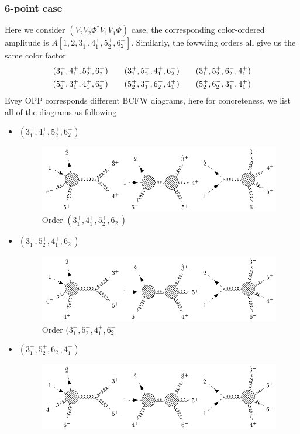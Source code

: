 \documentclass[12pt]{article}
\numberwithin{equation}{section}
\begin{document}
\subsubsection{6-point case}
Here we consider $(V_2V_2\Phi^\dagger V_1V_1 \Phi)$ case, the corresponding color-ordered amplitude is $A[1,2,3_1^+,4_1^+,5_2^+,6_2^-]$.
Similarly, the fowwling orders all give us the same color factor
\begin{gather}
    (3_1^+,4_1^+,5_2^+,6_2^-)\qquad(3_1^+,5_2^+,4_1^+,6_2^-)\qquad (3_1^+,5_2^+,6_2^-,4_1^+)\notag\\
    (5_2^+,3_1^+,4_1^+,6_2^-)\qquad(5_2^+,3_1^+,6_2^-,4_1^+)\qquad (5_2^+,6_2^-,3_1^+,4_1^+)
\end{gather}
Evey OPP corresponds different BCFW diagrams, here for concreteness, we list all of the diagrams as following 
\begin{itemize}
    \item $(3_1^+,4_1^+,5_2^+,6_2^-)$
    \begin{figure}[H]
        \centering
        \includegraphics{6pt1_1.pdf}
        \caption{Order $(3_1^+,4_1^+,5_2^+,6_2^-)$}
    \end{figure}
    \item $(3_1^+,5_2^+,4_1^+,6_2^-)$
    \begin{figure}[H]
        \centering
        \includegraphics{6pt1_2.pdf}
        \caption{Order $(3_1^+,5_2^+,4_1^+,6_2^-$}
    \end{figure}
    \item $(3_1^+,5_2^+,6_2^-,4_1^+)$
    \begin{figure}[H]
        \centering
        \includegraphics{6pt1_3.pdf}

\end{figure}
\end{itemize}
\end{document}
